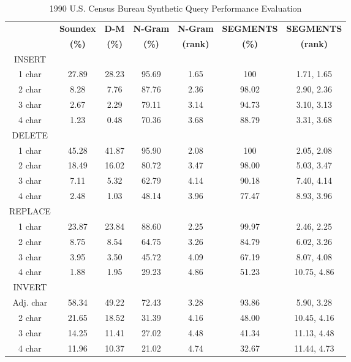 \documentclass{endm}
\begin{document}
\begin{CJK}{UTF8}{song}
\begin{table}
	\caption{1990 U.S. Census Bureau Synthetic Query Performance Evaluation}
	\centering
	\begin{tabular}{|c|c|c|c|c|c|c|}
		\hline
		 & \textbf{Soundex} & \textbf{D-M} & \textbf{N-Gram} & \textbf{N-Gram} & \textbf{SEGMENTS} & \textbf{SEGMENTS}\\
		 & \textbf{(\%)} & \textbf{(\%)} & \textbf{(\%)} & \textbf{(rank)} & \textbf{(\%)} & \textbf{(rank)} \\
		\hline
		INSERT & & & & & & \\
		\hline
		1 char & 27.89 & 28.23 & 95.69 & 1.65 & 100 & 1.71, 1.65 \\
		\hline
		2 char & 8.28 & 7.76 & 87.76 & 2.36 & 98.02 & 2.90, 2.36 \\
		\hline
		3 char & 2.67 & 2.29 & 79.11 & 3.14 & 94.73 & 3.10, 3.13 \\
		\hline
		4 char & 1.23 & 0.48 & 70.36 & 3.68 & 88.79 & 3.31, 3.68 \\
		\hline
		DELETE & & & & & & \\
		\hline
		1 char & 45.28 & 41.87 & 95.90 & 2.08 & 100 & 2.05, 2.08 \\
		\hline
		2 char & 18.49 & 16.02 & 80.72 & 3.47 & 98.00 & 5.03, 3.47 \\
		\hline
		3 char & 7.11 & 5.32 & 62.79 & 4.14 & 90.18 & 7.40, 4.14 \\
		\hline
		4 char & 2.48 & 1.03 & 48.14 & 3.96 & 77.47 & 8.93, 3.96 \\
		\hline
		REPLACE & & & & & & \\
		\hline
		1 char & 23.87 & 23.84 & 88.60 & 2.25 & 99.97 & 2.46, 2.25 \\
		\hline
		2 char & 8.75 & 8.54 & 64.75 & 3.26 & 84.79 & 6.02, 3.26 \\
		\hline
		3 char & 3.95 & 3.50 & 45.72 & 4.09 & 67.19 & 8.07, 4.08 \\
		\hline
		4 char & 1.88 & 1.95 & 29.23 & 4.86 & 51.23 & 10.75, 4.86 \\
		\hline
		INVERT & & & & & & \\
		\hline
		Adj. char & 58.34 & 49.22 & 72.43 & 3.28 & 93.86 & 5.90, 3.28 \\
		\hline
		2 char & 21.65 & 18.52 & 31.39 & 4.16 & 48.00 & 10.45, 4.16 \\
		\hline
		3 char & 14.25 & 11.41 & 27.02 & 4.48 & 41.34 & 11.13, 4.48 \\
		\hline
		4 char & 11.96 & 10.37 & 21.02 & 4.74 & 32.67 & 11.44, 4.73 \\
		\hline
	\end{tabular}
	\label{tab:us_census_bureau_performance_eval}
\end{table}







\end{CJK}
\end{document}
